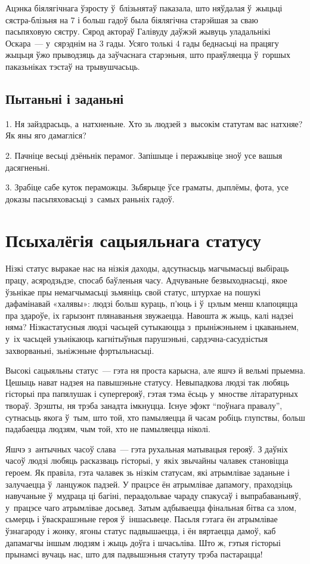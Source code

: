 Ацэнка біялягічнага ўзросту ў~блізьнятаў паказала, што няўдалая ў~жыцьці сястра-блізьня на 7 і больш гадоў была біялягічна старэйшая за сваю пасьпяховую сястру. Сярод актораў Галівуду даўжэй жывуць уладальнікі Оскара~--- у~сярэднім на 3 гады. Усяго толькі 4 гады беднасьці на працягу жыцьця ўжо прыводзяць да заўчаснага старэньня, што праяўляецца ў~горшых паказьніках тэстаў на трывушчасьць.

\subsection*{Пытаньні і заданьні}

1. Ня зайздрасьць, а~натхненьне. Хто зь людзей з~высокім статутам вас натхняе? Як яны яго дамагліся?

2. Пачніце весьці дзёньнік перамог. Запішыце і перажывіце зноў усе вашыя дасягненьні.

3. Зрабіце сабе куток пераможцы. Зьбярыце ўсе граматы, дыплёмы, фота, усе доказы пасьпяховасьці з~самых раньніх гадоў.


\section{Псыхалёгія сацыяльнага статусу}

Нізкі статус выракае нас на нізкія даходы, адсутнасьць магчымасьці выбіраць працу, асяродзьдзе, спосаб баўленьня часу. Адчуваньне безвыходнасьці, якое ўзьнікае пры немагчымасьці зьмяніць свой статус, штурхае на пошукі дафамінавай «халявы»: людзі больш кураць, п'юць і ў~цэлым менш клапоцяцца пра здароўе, іх гарызонт плянаваньня звужаецца. Навошта ж жыць, калі надзеі няма? Нізкастатусныя людзі часьцей сутыкаюцца з~прыніжэньнем і цкаваньнем, у~іх часьцей узьнікаюць кагнітыўныя парушэньні, сардэчна-сасудзістыя захворваньні, зьніжэньне фэртыльнасьці.

Высокі сацыяльны статус~--- гэта ня проста карысна, але яшчэ й вельмі прыемна. Цешыць нават надзея на павышэньне статусу. Невыпадкова людзі так любяць гісторыі пра папялушак і супергерояў, гэтая тэма ёсьць у~мностве літаратурных твораў. Зрэшты, ня трэба занадта імкнуцца. Існуе эфэкт ``поўнага правалу'', сутнасьць якога ў~тым, што той, хто памыляецца й часам робіць глупствы, больш падабаецца людзям, чым той, хто не памыляецца ніколі.

Яшчэ з~антычных часоў слава~--- гэта рухальная матывацыя герояў. З даўніх часоў людзі любяць расказваць гісторыі, у~якіх звычайны чалавек становіцца героем. Як правіла, гэта чалавек зь нізкім статусам, які атрымлівае заданьне і залучаецца ў~ланцужок падзей. У працэсе ён атрымлівае дапамогу, праходзіць навучаньне ў~мудраца ці багіні, пераадольвае чараду спакусаў і выпрабаваньняў, у~працэсе чаго атрымлівае досьвед. Затым адбываецца фінальная бітва са злом, сьмерць і ўваскрашэньне героя ў~іншасьвеце. Пасьля гэтага ён атрымлівае ўзнагароду і жонку, ягоны статус падвышаецца, і ён вяртаецца дамоў, каб дапамагчы іншым людзям і жыць доўга і шчасьліва. Што ж, гэтыя гісторыі прынамсі вучаць нас, што для падвышэньня статуту трэба пастарацца!

